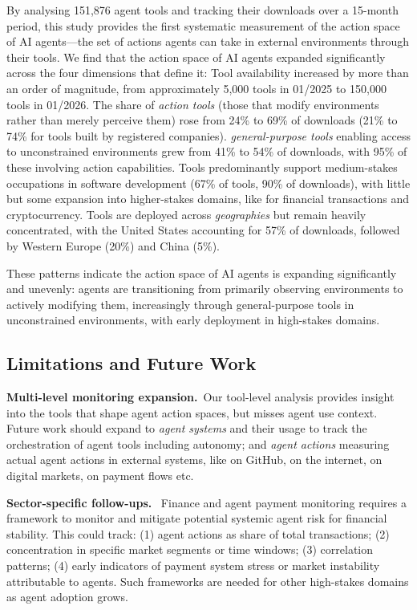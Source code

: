 \documentclass[manuscript,screen,nonacm,oneside]{acmart}
\begin{document}
By analysing 151,876 agent tools and tracking their downloads over a 15-month period, this study provides the first systematic measurement of the action space of AI agents---the set of actions agents can take in external environments through their tools. We find that the action space of AI agents expanded significantly across the four dimensions that define it: Tool availability increased by more than an order of magnitude, from approximately 5,000 tools in 01/2025 to 150,000 tools in 01/2026. The share of \emph{action tools} (those that modify environments rather than merely perceive them) rose from 24\% to 69\% of downloads (21\% to 74\% for tools built by registered companies). \emph{general-purpose tools} enabling access to unconstrained environments grew from 41\% to 54\% of downloads, with 95\% of these involving action capabilities. Tools predominantly support medium-stakes occupations in software development (67\% of tools, 90\% of downloads), with little but some expansion into higher-stakes domains, like for financial transactions and cryptocurrency. Tools are deployed across \emph{geographies} but remain heavily concentrated, with the United States accounting for 57\% of downloads, followed by Western Europe (20\%) and China (5\%).

These patterns indicate the action space of AI agents is expanding significantly and unevenly: agents are transitioning from primarily observing environments to actively modifying them, increasingly through general-purpose tools in unconstrained environments, with early deployment in high-stakes domains.

\subsection{Limitations and Future Work}

\textbf{Multi-level monitoring expansion.}~Our tool-level analysis provides insight into the tools that shape agent action spaces, but misses agent use context. Future work should expand to \emph{agent systems} and their usage to track the orchestration of agent tools including autonomy; and \emph{agent actions} measuring actual agent actions in external systems, like on GitHub, on the internet, on digital markets, on payment flows etc.

\textbf{Sector-specific follow-ups.}~ Finance and agent payment monitoring requires a framework to monitor and mitigate potential systemic agent risk for financial stability. This could track: (1) agent actions as share of total transactions; (2) concentration in specific market segments or time windows; (3) correlation patterns; (4) early indicators of payment system stress or market instability attributable to agents. Such frameworks are needed for other high-stakes domains as agent adoption grows.
\end{document}
